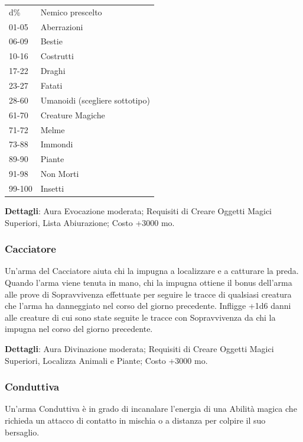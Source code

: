 \begin{multicols}{2}
	\medskip

	\begin{tabular}{ll}
		d\% &Nemico prescelto\\
		01-05 &Aberrazioni\\
		06-09 &Bestie\\
		10-16 &Costrutti\\
		17-22 &Draghi\\
		23-27 &Fatati\\
		28-60 &Umanoidi (scegliere sottotipo)\\
		61-70 &Creature Magiche\\
		71-72 &Melme\\
		73-88 &Immondi\\
		89-90 &Piante\\
		91-98 &Non Morti\\
		99-100 &Insetti\\
	\end{tabular}

	\medskip

	\textbf{Dettagli}: Aura Evocazione moderata; Requisiti di Creare Oggetti Magici Superiori, Lista Abiurazione; Costo +3000 mo.

	\subsubsection*{Cacciatore}

	Un'arma del Cacciatore aiuta chi la impugna a localizzare e a catturare la preda. Quando l'arma viene tenuta in mano, chi la impugna ottiene il bonus dell'arma alle prove di Sopravvivenza effettuate per seguire le tracce di qualsiasi creatura che l'arma ha danneggiato nel corso del giorno precedente. Infligge +1d6 danni alle creature di cui sono state seguite le tracce con Sopravvivenza da chi la impugna nel corso del giorno precedente.

	\textbf{Dettagli}: Aura Divinazione moderata; Requisiti di Creare Oggetti Magici Superiori, Localizza Animali e Piante; Costo +3000 mo.

	\subsubsection*{Conduttiva}

	Un'arma Conduttiva è in grado di incanalare l'energia di una Abilità magica che richieda un attacco di contatto in mischia o a distanza per colpire il suo bersaglio.


\end{multicols}
